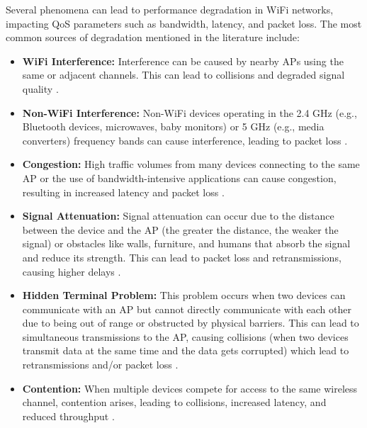 Several phenomena can lead to performance degradation in WiFi networks, impacting QoS parameters such as bandwidth, latency, and packet loss. The most common sources of degradation mentioned in the literature include:

\begin{itemize} 
    \item \textbf{WiFi Interference:} Interference can be caused by nearby APs using the same or adjacent channels. This can lead to collisions and degraded signal quality \cite{pei2016wifi, pefkianakis2015characterizing, syrigos2019employment}. 
    \item \textbf{Non-WiFi Interference:} Non-WiFi devices operating in the 2.4 GHz (e.g., Bluetooth devices, microwaves, baby monitors) or 5 GHz (e.g., media converters) frequency bands can cause interference, leading to packet loss \cite{kim2014wislow, pefkianakis2015characterizing, salik2023non}. 
    \item \textbf{Congestion:} High traffic volumes from many devices connecting to the same AP or the use of bandwidth-intensive applications can cause congestion, resulting in increased latency and packet loss \cite{kanuparthy2012can, pei2016wifi, salinas2018home}.
    \item \textbf{Signal Attenuation:} Signal attenuation can occur due to the distance between the device and the AP (the greater the distance, the weaker the signal) or obstacles like walls, furniture, and humans that absorb the signal and reduce its strength. This can lead to packet loss and retransmissions, causing higher delays \cite{rayanchu2008diagnosing, pei2016wifi, kanuparthy2012can, salinas2018home, syrigos2019employment}.
    \item \textbf{Hidden Terminal Problem:} This problem occurs when two devices can communicate with an AP but cannot directly communicate with each other due to being out of range or obstructed by physical barriers. This can lead to simultaneous transmissions to the AP, causing collisions (when two devices transmit data at the same time and the data gets corrupted) which lead to retransmissions and/or packet loss \cite{kanuparthy2012can, syrigos2019employment}. 
    \item \textbf{Contention:} When multiple devices compete for access to the same wireless channel, contention arises, leading to collisions, increased latency, and reduced throughput \cite{rayanchu2008diagnosing, kim2014wislow, syrigos2019employment}.
\end{itemize}




